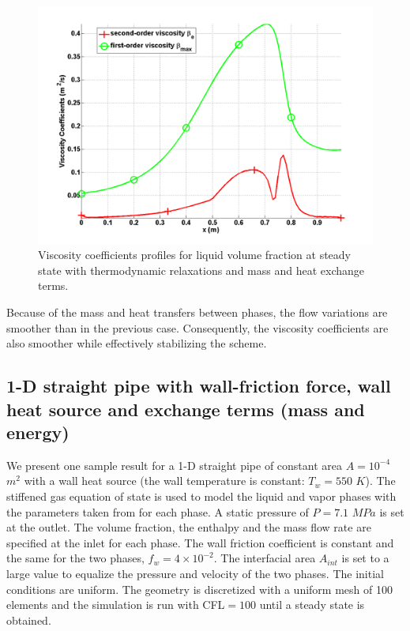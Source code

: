 %
\begin{figure}[H]
\centering
\includegraphics[width=\textwidth]{figures/SEM/Aint1e3MassOn_liquid_beta.png}
\caption{Viscosity coefficients profiles for liquid volume fraction at steady state with thermodynamic relaxations and mass and heat exchange terms.}
\label{fig:two-fluids-rel-nozzle-visc-vf-mass-on-sem-sect4}
\end{figure}
%
Because of the mass and heat transfers between phases, the flow variations are smoother than in the previous case. Consequently, the viscosity coefficients are also smoother while effectively stabilizing the scheme.  
\subsection{1-D straight pipe with wall-friction force, wall heat source and exchange terms (mass and energy)}\label{sec:1d-straight-pipe-7-eq-sct4}
We present one sample result for a 1-D straight pipe of constant area $A = 10^{-4}$ $m^2$ with a wall heat source (the wall temperature is constant: $T_w = 550$ $K$). The stiffened gas equation of state is used to model the liquid and vapor phases with the parameters taken from \cite{SGEOS} for each phase. A static pressure of $P=7.1$ $MPa$ is set at the outlet. The volume fraction, the enthalpy and the mass flow rate are specified at the inlet for each phase. The wall friction coefficient is constant and the same for the two phases, $f_w = 4 \times 10^{-2}$. The interfacial area $A_{int}$ is set to a large value to equalize the pressure and velocity of the two phases. The initial conditions are uniform. The geometry is discretized with a uniform mesh of 100 elements and the simulation is run with CFL$=100$  until a steady state is obtained. 

